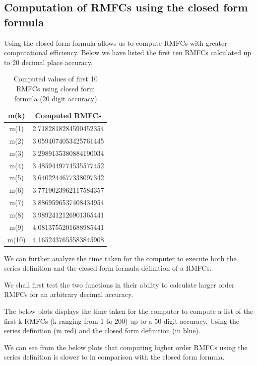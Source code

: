 \documentclass[12pt]{article}
\numberwithin{equation}{section}
\begin{document}
\subsection{Computation of RMFCs using the closed form formula}
\par
Using the closed form formula allows us to compute RMFCs with greater computational efficiency. Below we have listed the first ten RMFCs calculated up to 20 decimal place accuracy.
\begin{table}[h!]
\centering
\begin{tabular}{cc}
\hline
m(k) & Computed RMFCs \\ \hline
m(1) & 2.7182818284590452354 \\
m(2) & 3.0594074053425761445 \\
m(3) & 3.2989135380884190034 \\
m(4) & 3.4859449774535577452 \\
m(5) & 3.6402244677338097342 \\
m(6) & 3.7719023962117584357 \\
m(7) & 3.8869596537408434954 \\
m(8) & 3.9892412126901365441 \\
m(9) & 4.0813755201688985441 \\
m(10) & 4.1652437655583845908 \\ \hline
\end{tabular}
\caption{ Computed values of first 10 RMFCs using closed form formula (20 digit accuracy)}
\label{tab:closedformrmfcvalues}
\end{table}
\par We can further analyze the time taken for the computer to execute both the series definition and the closed form formula definition of a RMFCs.\par
We shall first test the two functions in their ability to calculate larger order RMFCs for an arbitrary decimal accuracy.\par
The below plots displays the time taken for the computer to compute a list of the first k RMFCs (k ranging from 1 to 200) up to a 50 digit accuracy. Using the series definition (in red) and the closed form definition (in blue).\par
We can see from the below plots that computing higher order RMFCs using the series definition is slower to in comparison with the closed form formula.
\end{document}
